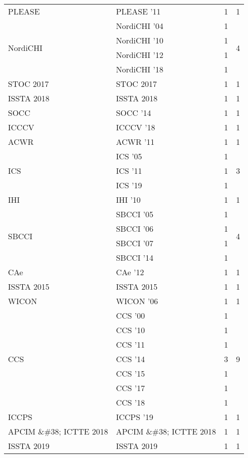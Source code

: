 \begin{table*}[t]
\begin{tabular}{llrr}
\multirow{1}{*}{PLEASE } & PLEASE '11 & 1 & \multirow{1}{*}{1}\\
\multirow{4}{*}{NordiCHI } & NordiCHI '04 & 1 & \multirow{4}{*}{4}\\
& NordiCHI '10 & 1 &\\
& NordiCHI '12 & 1 &\\
& NordiCHI '18 & 1 &\\
\multirow{1}{*}{STOC 2017} & STOC 2017 & 1 & \multirow{1}{*}{1}\\
\multirow{1}{*}{ISSTA 2018} & ISSTA 2018 & 1 & \multirow{1}{*}{1}\\
\multirow{1}{*}{SOCC } & SOCC '14 & 1 & \multirow{1}{*}{1}\\
\multirow{1}{*}{ICCCV } & ICCCV '18 & 1 & \multirow{1}{*}{1}\\
\multirow{1}{*}{ACWR } & ACWR '11 & 1 & \multirow{1}{*}{1}\\
\multirow{3}{*}{ICS } & ICS '05 & 1 & \multirow{3}{*}{3}\\
& ICS '11 & 1 &\\
& ICS '19 & 1 &\\
\multirow{1}{*}{IHI } & IHI '10 & 1 & \multirow{1}{*}{1}\\
\multirow{4}{*}{SBCCI } & SBCCI '05 & 1 & \multirow{4}{*}{4}\\
& SBCCI '06 & 1 &\\
& SBCCI '07 & 1 &\\
& SBCCI '14 & 1 &\\
\multirow{1}{*}{CAe } & CAe '12 & 1 & \multirow{1}{*}{1}\\
\multirow{1}{*}{ISSTA 2015} & ISSTA 2015 & 1 & \multirow{1}{*}{1}\\
\multirow{1}{*}{WICON } & WICON '06 & 1 & \multirow{1}{*}{1}\\
\multirow{7}{*}{CCS } & CCS '00 & 1 & \multirow{7}{*}{9}\\
& CCS '10 & 1 &\\
& CCS '11 & 1 &\\
& CCS '14 & 3 &\\
& CCS '15 & 1 &\\
& CCS '17 & 1 &\\
& CCS '18 & 1 &\\
\multirow{1}{*}{ICCPS } & ICCPS '19 & 1 & \multirow{1}{*}{1}\\
\multirow{1}{*}{APCIM \&\#38; ICTTE 2018} & APCIM \&\#38; ICTTE 2018 & 1 & \multirow{1}{*}{1}\\
\multirow{1}{*}{ISSTA 2019} & ISSTA 2019 & 1 & \multirow{1}{*}{1}\\

\end{tabular}
\end{table*}

